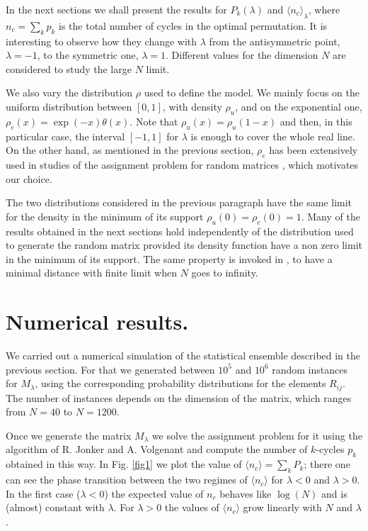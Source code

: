 \documentclass[]{iopart}
\begin{document}
In the next sections we shall present the results for 
$P_k(\lambda)$ and $\langle n_c\rangle_\lambda$, where $n_c=\sum_k p_k$ is the 
total number of cycles in the optimal permutation.
It is interesting to observe how they change
with $\lambda$ from the antisymmetric point, $\lambda=-1$,
to the symmetric one, $\lambda=1$. 
Different values for the dimension $N$ are considered
to study the large $N$ limit.

We also vary the distribution $\rho$ used to define the model.
We mainly focus on the uniform distribution between $[0,1]$,
with density $\rho_u$, and on the exponential one, 
$\rho_e(x)=\exp(-x)\theta(x)$. 
Note that $\rho_u(x)=\rho_u(1-x)$ and then, in this particular
case, the interval $[-1,1]$ for $\lambda$
is enough to cover the whole
real line. On the other hand, as mentioned in the previous section, 
$\rho_e$ has been extensively used in
studies of the assignment problem for random matrices 
\cite{P1},\cite{P5} which motivates our choice.

The two distributions considered in the previous paragraph
have the same limit for the density in the minimum
of its support $\rho_u(0)=\rho_e(0)=1$. 
Many of the results obtained in the next sections hold independently 
of the distribution used to generate the random matrix provided 
its density function have a non 
zero limit in the minimum of its support. 
The same property is invoked in \cite{P1},\cite{P5}
to have a minimal distance with finite limit when $N$
goes to infinity.    

\section{Numerical results.}

We carried out a numerical simulation of the
statistical ensemble described in the previous section.
For that we generated between $10^5$ and $10^6$
random instances for $M_\lambda$, using the corresponding
probability distributions for the elements $R_{{i}{j}}$. 
The number of instances depends
on the dimension of the matrix, which ranges from $N=40$ to 
$N=1200$.

Once we generate the matrix $M_\lambda$ we solve the assignment
problem for it using the algorithm of R. Jonker and A. Volgenant
\cite{JV} and compute the number of $k$-cycles $p_k$ obtained in this way.
 In Fig. \ref{fig1} we plot the value of 
$\langle n_c\rangle = \sum_k P_k$; 
there one can see the phase transition between the two regimes of 
$\langle n_c\rangle$ for $\lambda <0$ and $\lambda > 0$. 
In the first case ($\lambda <0$) the expected value of $n_c$
 behaves like $\log (N)$ and is (almost) constant with $\lambda$. 
For $\lambda>0$ the values of $\langle n_c\rangle$ 
grow linearly with $N$ and $\lambda$
\cite{EstFal}.
\end{document}
